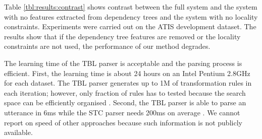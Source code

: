 \documentclass{article}
\newcommand{\efgr}[2]{
  \begin{figure}[htbp]
    \makebox[8.5cm]{\framebox[5cm]{\rule{0pt}{5cm}}}
    \caption{#2}
    \label{#1}
  \end{figure}
}
\begin{document}



Table \ref{tbl:results:contrast} shows contrast between the full system and the system with no features extracted from dependency trees and the system with no locality constraints. Experiments were carried out on the ATIS development dataset. The results show that if the dependency tree features are removed or the locality constraints are not used, the performance of our method degrades.

The learning time of the TBL parser is acceptable and the parsing process is efficient. 
First, the learning time is about 24 hours on an Intel Pentium 2.8GHz for each dataset. The TBL parser generates up to 1M of transformation rules in each iteration; however, only fraction of rules has to tested because the search space can be efficiently organised \cite{brill95}.
Second, the TBL parser is able to parse an utterance in 6ms while the STC parser needs 200ms on average \cite{mairesse09}. We cannot report on speed of other approaches because such information is not publicly available.
\end{document}
